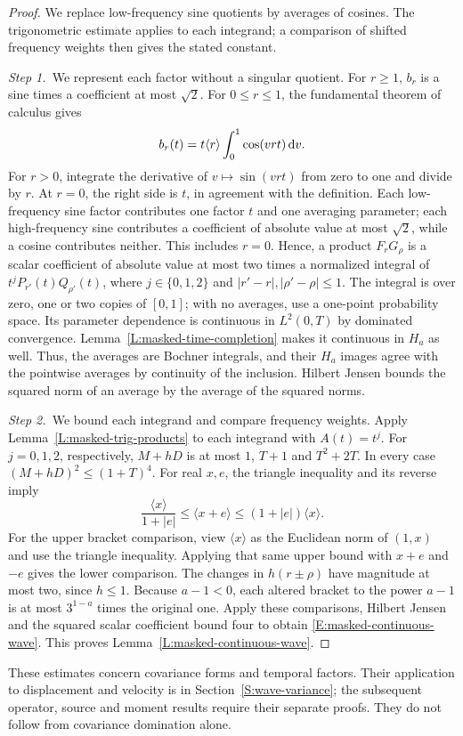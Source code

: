\begin{proof}
  We replace low-frequency sine quotients by averages of cosines. The
  trigonometric estimate applies to each integrand; a comparison of shifted
  frequency weights then gives the stated constant.

  \medskip
  \noindent\textit{Step 1.~}We represent each factor without a singular
  quotient.
  For $r \ge 1$, $b_r$ is a sine times a coefficient at most $\sqrt{2}$. For $0
  \le r \le 1$, the fundamental theorem of calculus gives
  \[
    b_r(t) = t\langle r\rangle\int_0^1\cos(vrt)\,\mathrm{d} v.
  \]
  For $r > 0$, integrate the derivative of $v \mapsto \sin(vrt)$ from zero to
  one and divide by $r$. At $r = 0$, the right side is $t$, in agreement with
  the definition.
  Each low-frequency sine factor contributes one factor $t$ and one averaging
  parameter; each high-frequency sine contributes a coefficient of absolute
  value at most $\sqrt2$, while a cosine contributes neither.
  This includes $r = 0$. Hence, a product $F_rG_\rho$ is a scalar coefficient of
  absolute value at most two times a normalized integral of
  $t^jP_{r'}(t)Q_{\rho'}(t)$, where $j \in \{0,1,2\}$ and $|r'-r|,|\rho'-\rho|
  \le 1$. The integral is over zero, one or two copies of $[0,1]$; with no
  averages, use a one-point probability space. Its parameter dependence is
  continuous in $L^2(0,T)$ by dominated convergence.
  Lemma~\ref{L:masked-time-completion} makes it continuous in $H_a$ as well.
  Thus, the averages are Bochner integrals, and their $H_a$ images agree with
  the pointwise averages by continuity of the inclusion. Hilbert Jensen bounds
  the squared norm of an average by the average of the squared norms.

  \medskip
  \noindent\textit{Step 2.~}We bound each integrand and compare frequency
  weights.
  Apply Lemma~\ref{L:masked-trig-products} to each integrand with $A(t) = t^j$.
  For $j = 0,1,2$, respectively, $M+hD$ is at most $1$, $T+1$ and $T^2+2T$. In
  every case $(M+hD)^2 \le (1+T)^4$. For real $x,e$, the triangle inequality and
  its reverse imply
  \[
    \frac{\langle x\rangle}{1+|e|}
    \le \langle x+e\rangle \le (1+|e|)\langle x\rangle.
  \]
  For the upper bracket comparison, view $\langle x\rangle$ as the Euclidean
  norm of $(1,x)$ and use the triangle inequality. Applying that same upper
  bound with $x+e$ and $-e$ gives the lower comparison.
  The changes in $h(r\pm\rho)$ have magnitude at most two, since $h \le 1$.
  Because $a-1 < 0$, each altered bracket to the power $a-1$ is at most
  $3^{1-a}$ times the original one. Apply these comparisons, Hilbert Jensen and
  the squared scalar coefficient bound four to obtain
  \eqref{E:masked-continuous-wave}. This proves
  Lemma~\ref{L:masked-continuous-wave}.
\end{proof}

These estimates concern covariance forms and temporal factors. Their application
to displacement and velocity is in Section~\ref{S:wave-variance}; the subsequent
operator, source and moment results require their separate proofs. They do not
follow from covariance domination alone.
